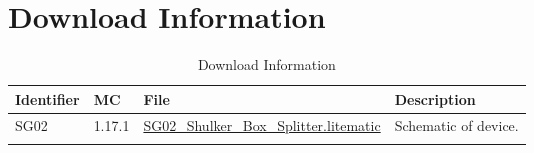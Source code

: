 \documentclass[10pt]{datasheet}
\begin{document}
\section{Download Information}
\begin{table}[h]
    \caption{Download Information}
    \begin{tabularx}{\textwidth}{l | l | l | X}
        \thickhline
        \textbf{Identifier} & \textbf{MC} & \textbf{File} & \textbf{Description} \\
        \hline
        SG02 & 1.17.1 & \href{https://github.com/Soontech-Annals/Archive/blob/364bde8dbcbc2e5337489ff435bcda9b387017e2/Archive/splitting/SG02\%20Shulker\%20Box\%20Splitter/SG02\_Shulker\_Box\_Splitter.litematic?raw=1}{SG02\_Shulker\_Box\_Splitter.litematic} & Schematic of device. \\
        \hline
        \thickhline
    \end{tabularx}
\end{table}
\end{document}
